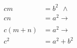 \documentclass[preview]{standalone}
\begin{document}
\begin{math}
        \begin{aligned}
        cm &= b^2 \ \ \wedge \\
        cn &= a^2 \to \\
        \\
        c(m + n) &= a^2 \to \\
        c^2 &= a^2 + b^2
        \end{aligned}
        \end{math}
\end{document}
